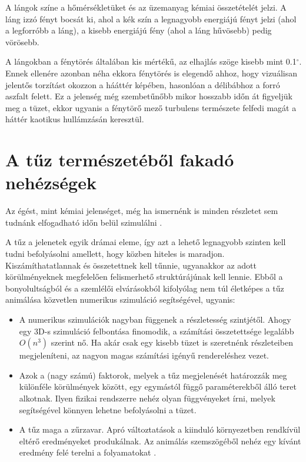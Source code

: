 A lángok színe a hőmérsékletüket és az üzemanyag kémiai összetételét jelzi. A láng izzó fényt bocsát ki, ahol a kék szín a legnagyobb energiájú fényt jelzi (ahol a legforróbb a láng), a kisebb energiájú fény (ahol a láng hűvösebb) pedig vörösebb.

\cite{firePhysics1}

A lángokban a fénytörés általában kis mértékű, az elhajlás szöge kisebb mint 0.1$^{\circ}$. Ennek ellenére azonban néha ekkora fénytörés is elegendő ahhoz, hogy vizuálisan jelentős torzítást okozzon a hááttér képében, hasonlóan a délibábhoz a forró aszfalt felett. Ez a jelenség még szembetűnőbb mikor hosszabb időn át figyeljük meg a tüzet, ekkor ugyanis a fénytörő mező turbulens természete felfedi magát a háttér kaotikus hullámzásán keresztül.
\cite{swhThreeDimensionalReconst}

\section{A tűz természetéből fakadó nehézségek}
Az égést, mint kémiai jelenséget, még ha ismernénk is minden részletet sem tudnánk elfogadható időn belül szimulálni  \cite{firestarter}.

A tűz a jelenetek egyik drámai eleme, így azt a lehető legnagyobb szinten kell tudni befolyásolni amellett, hogy közben hiteles is maradjon. Kiszámíthatatlannak és összetettnek kell tűnnie, ugyanakkor az adott körülményeknek megfelelően felismerhető struktúrájúnak kell lennie. Ebből a bonyolultságból és a szemlélői elvárásokból kifolyólag nem túl életképes a tűz animálása közvetlen numerikus szimuláció segítségével, ugyanis:
\begin{itemize}
\item
A numerikus szimulációk nagyban függenek a részletesség szintjétől. Ahogy egy 3D-s szimuláció felbontása finomodik, a számítási összetettsége legalább $O(n^3)$ szerint nő. Ha akár csak egy kisebb tüzet is szeretnénk részleteiben megjeleníteni, az nagyon magas számítási igényű rendereléshez vezet.
\item
Azok a (nagy számú) faktorok, melyek a tűz megjelenését határozzák meg különféle körülmények között, egy egymástól függő paraméterekből álló teret alkotnak. Ilyen fizikai rendszerre nehéz olyan függvényeket írni, melyek segítségével könnyen lehetne befolyásolni a tüzet. 
\item
A tűz maga a zűrzavar. Apró változtatások a kiinduló környezetben rendkívül eltérő eredményeket produkálnak. Az animálás szemszögéből nehéz egy kívánt eredmény felé terelni a folyamatokat \cite{ArNiStructuralModeling}.
\end{itemize}

